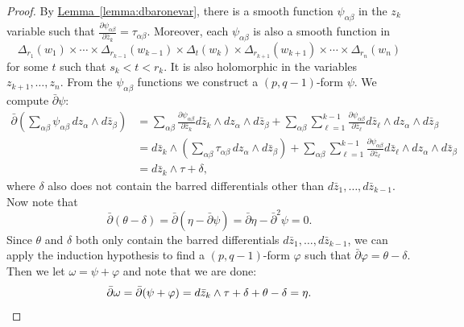 \documentclass[12pt,openany]{book}
\theoremstyle{plain}
\theoremstyle{remark}
\theoremstyle{definition}
\theoremstyle{exercise}
\theoremstyle{example}
\newcommand{\lemmaref}[1]{\hyperref[#1]{Lemma~\ref*{#1}}}
\begin{document}
\begin{proof}
By \lemmaref{lemma:dbaronevar}, there is a smooth function
$\psi_{\alpha\beta}$ in the
$z_k$ variable such that $\frac{\partial \psi_{\alpha\beta}}{\partial \bar{z}_k} =
\tau_{\alpha \beta}$.  Moreover, each $\psi_{\alpha\beta}$ is also a smooth function
in
\begin{equation*}
\Delta_{r_1}(w_1)
\times \cdots \times
\Delta_{r_{k-1}}(w_{k-1})
\times
\Delta_{t}(w_{k})
\times
\Delta_{r_{k+1}}(w_{k+1})
\times \cdots \times
\Delta_{r_{n}}(w_{n})
\end{equation*}
for some $t$ such that $s_k < t < r_k$.
It is also holomorphic in the variables $z_{k+1},\ldots,z_n$.
From the $\psi_{\alpha\beta}$ functions we construct a $(p,q-1)$-form $\psi$.
We compute $\bar{\partial}\psi$:
\begin{equation*}
\begin{split}
\bar{\partial} \left(
\sum_{\alpha \beta}
\psi_{\alpha\beta} \, dz_\alpha \wedge d\bar{z}_\beta
\right)
& =
\sum_{\alpha \beta}
\frac{\partial \psi_{\alpha\beta}}{\partial \bar{z}_k} d\bar{z}_k
\wedge dz_\alpha \wedge d\bar{z}_\beta
+
\sum_{\alpha \beta}
\sum_{\ell=1}^{k-1}
\frac{\partial \psi_{\alpha\beta}}{\partial \bar{z}_\ell} d\bar{z}_\ell
\wedge dz_\alpha \wedge d\bar{z}_\beta
\\
& =
d\bar{z}_k
\wedge
\left(
\sum_{\alpha \beta}
\tau_{\alpha\beta}
\,
dz_\alpha \wedge d\bar{z}_\beta
\right)
+
\sum_{\alpha \beta}
\sum_{\ell=1}^{k-1}
\frac{\partial \psi_{\alpha\beta}}{\partial \bar{z}_\ell} d\bar{z}_\ell
\wedge dz_\alpha \wedge d\bar{z}_\beta
\\
& =
d\bar{z}_k \wedge \tau + \delta ,
\end{split}
\end{equation*}
where $\delta$ also does not contain
the barred differentials other than $d\bar{z}_1,\ldots,d\bar{z}_{k-1}$.
Now note that
\begin{equation*}
\bar{\partial}(\theta-\delta)
=
\bar{\partial}(\eta-\bar{\partial} \psi)
=
\bar{\partial}\eta-\bar{\partial}^2 \psi = 0 .
\end{equation*}
Since $\theta$ and $\delta$ both only contain the barred differentials
$d\bar{z}_1,\ldots,d\bar{z}_{k-1}$, we can apply the
induction hypothesis to find a $(p,q-1)$-form $\varphi$ such that
$\bar{\partial} \varphi = \theta-\delta$.  Then we let
$\omega = \psi+\varphi$ and note that we are done:
\begin{equation*}
\bar{\partial} \omega
=
\bar{\partial} (\psi+\varphi )
=
d\bar{z}_k \wedge \tau + \delta + \theta - \delta
=
\eta .
\qedhere
\end{equation*}
\end{proof}
\end{document}
